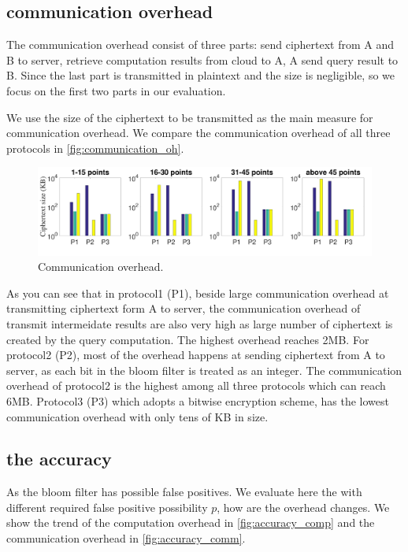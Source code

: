 \subsection{communication overhead}
The communication overhead consist of three parts: send ciphertext from A and B to server, retrieve computation results from cloud to A, A send query result to B. Since the last part is transmitted in plaintext and the size is negligible, so we focus on the first two parts in our evaluation. 

We use the size of the ciphertext to be transmitted as the main measure for communication overhead. We compare the communication overhead of all three protocols in \autoref{fig:communication_oh}.

\begin{figure}[h]
    \centering
    \includegraphics[width=\linewidth]{figures/communication_oh.pdf}
    \caption{Communication overhead.}
    \label{fig:communication_oh}
\end{figure}

As you can see that in protocol1 (P1), beside large communication overhead at transmitting ciphertext form A to server, the communication overhead of transmit intermeidate results are also very high as large number of ciphertext is created by the query computation. The highest overhead reaches 2MB. For protocol2 (P2), most of the overhead happens at sending ciphertext from A to server, as each bit in the bloom filter is treated as an integer. The communication overhead of protocol2 is the highest among all three protocols which can reach 6MB. Protocol3 (P3) which adopts a bitwise encryption scheme, has the lowest communication overhead with only tens of KB in size. 

\subsection{the accuracy}
As the bloom filter has possible false positives. We evaluate here the with different required false positive possibility $p$, how are the overhead changes. We show the trend of the computation overhead in \autoref{fig:accuracy_comp} and the communication overhead in \autoref{fig:accuracy_comm}.

